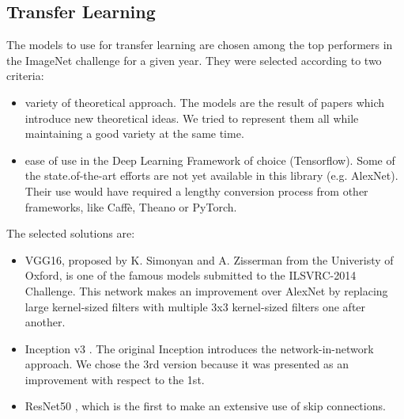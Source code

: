 \subsection{Transfer Learning} \label{sub:transferlarning}
The models to use for transfer learning are chosen among the top performers in the ImageNet challenge \cite{ILSVRC15} for a given year. They were selected according to two criteria:
\begin{itemize}
	\item variety of theoretical approach. The models are the result of papers which introduce new theoretical ideas. We tried to represent them all while maintaining a good variety at the same time. 
	\item ease of use in the Deep Learning Framework of choice (Tensorflow). Some of the state.of-the-art efforts are not yet available in this library (e.g. AlexNet). Their use would have required a lengthy conversion process from other frameworks, like Caffè, Theano or PyTorch.
\end{itemize}

The selected solutions are:
\begin{itemize}
	\item VGG16, proposed by K. Simonyan and A. Zisserman from the Univeristy of Oxford, is one of the famous models submitted to the ILSVRC-2014 Challenge. This network makes an improvement over AlexNet by replacing large kernel-sized filters with multiple 3x3 kernel-sized filters one after another.
	\item Inception v3 \cite{DBLP:journals/corr/SzegedyVISW15}. The original Inception \cite{DBLP:journals/corr/SzegedyLJSRAEVR14} introduces the network-in-network approach. We chose the 3rd version because it was presented as an improvement with respect to the 1st.
	\item ResNet50 \cite{DBLP:journals/corr/HeZRS15}, which is the first to make an extensive use of skip connections.
\end{itemize}

